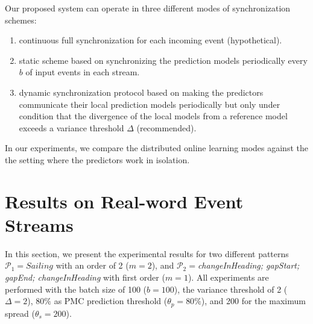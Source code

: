 Our proposed system can operate in three different modes of synchronization schemes: 
\begin{enumerate}[label=(\roman*)] 
	\item continuous full synchronization for each incoming event (hypothetical).
	\item static scheme based on synchronizing the prediction models periodically every $b$ of input events in each stream.
	\item dynamic synchronization protocol based on making the predictors communicate their local prediction models periodically but only under condition that the divergence of the local models from a reference model exceeds a variance threshold $\Delta$ (recommended).  	   
	
\end{enumerate}

In our experiments, we compare the distributed online learning modes against the the setting where the \pmcmr predictors work in isolation. 

\section{Results on Real-word Event Streams}
\label{sec:results_real}

In this section, we present the experimental results for two different patterns  $\mathcal{P}_1=Sailing$ with an order of 2 ($m=2$), and  $\mathcal{P}_2=$\textit{changeInHeading; gapStart; gapEnd; changeInHeading} with first order ($m=1$). All experiments are performed with the batch size of 100  ($b=100$), the variance threshold of 2 ($\Delta=2$), $80\%$ as PMC prediction threshold ($\theta_{p}=80\%$), and 200 for the maximum spread ($\theta_{s}=200$).

